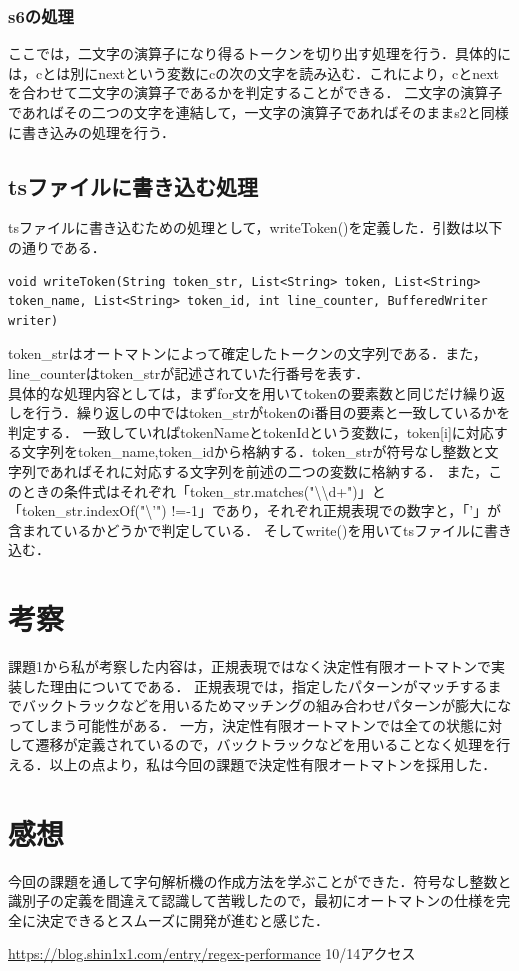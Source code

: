 \documentclass[dvipdfmx]{jarticle}
\begin{document}
\subsubsection{s6の処理}
ここでは，二文字の演算子になり得るトークンを切り出す処理を行う．具体的には，cとは別にnextという変数にcの次の文字を読み込む．これにより，cとnextを合わせて二文字の演算子であるかを判定することができる．
二文字の演算子であればその二つの文字を連結して，一文字の演算子であればそのままs2と同様に書き込みの処理を行う．
\subsection{tsファイルに書き込む処理}
tsファイルに書き込むための処理として，writeToken()を定義した．引数は以下の通りである．
\begin{lstlisting}
void writeToken(String token_str, List<String> token, List<String> token_name, List<String> token_id, int line_counter, BufferedWriter writer)
\end{lstlisting}
token\_strはオートマトンによって確定したトークンの文字列である．また，line\_counterはtoken\_strが記述されていた行番号を表す．
\\具体的な処理内容としては，まずfor文を用いてtokenの要素数と同じだけ繰り返しを行う．繰り返しの中ではtoken\_strがtokenのi番目の要素と一致しているかを判定する．
一致していればtokenNameとtokenIdという変数に，token[i]に対応する文字列をtoken\_name,token\_idから格納する．token\_strが符号なし整数と文字列であればそれに対応する文字列を前述の二つの変数に格納する．
また，このときの条件式はそれぞれ「token\_str.matches("\textbackslash\textbackslash d+")」と「token\_str.indexOf("\textbackslash'") !=-1」であり，それぞれ正規表現での数字と，「’」が含まれているかどうかで判定している．
そしてwrite()を用いてtsファイルに書き込む．
\section{考察}
課題1から私が考察した内容は，正規表現ではなく決定性有限オートマトンで実装した理由についてである．
正規表現では，指定したパターンがマッチするまでバックトラックなどを用いるためマッチングの組み合わせパターンが膨大になってしまう可能性がある．\cite{1}
一方，決定性有限オートマトンでは全ての状態に対して遷移が定義されているので，バックトラックなどを用いることなく処理を行える．以上の点より，私は今回の課題で決定性有限オートマトンを採用した．
\section{感想}
今回の課題を通して字句解析機の作成方法を学ぶことができた．符号なし整数と識別子の定義を間違えて認識して苦戦したので，最初にオートマトンの仕様を完全に決定できるとスムーズに開発が進むと感じた．
\begin{thebibliography}{1}
     \url{https://blog.shin1x1.com/entry/regex-performance} 10/14アクセス
\end{thebibliography}
\end{document}
